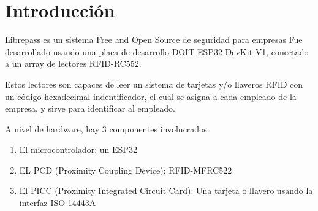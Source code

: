 \documentclass[../informe_krapp.tex]{subfiles}
\begin{document}
\graphicspath{{../images/}}
\section{Introducción}
Librepass es un sistema Free and Open Source de seguridad para empresas
Fue desarrollado usando una placa de desarrollo DOIT ESP32 DevKit V1, conectado
a un array de lectores RFID-RC552.

Estos lectores son capaces de leer un sistema de tarjetas y/o llaveros RFID con un
código hexadecimal indentificador, el cual se asigna a cada empleado de la empresa, y
sirve para identificar al empleado.

A nivel de hardware, hay 3 componentes involucrados:
\begin{enumerate}
	\item El microcontrolador: un ESP32
	\item EL PCD (Proximity Coupling Device): RFID-MFRC522
	\item El PICC (Proximity Integrated Circuit Card): Una tarjeta o llavero usando
	      la interfaz ISO 14443A
\end{enumerate}
\end{document}
